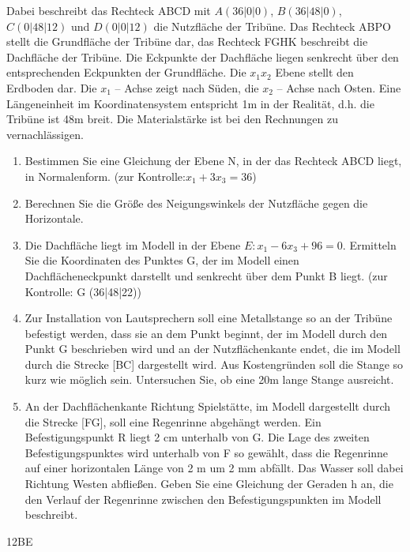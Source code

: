 \documentclass[a4paper,12pt]{article}
\begin{document}
Dabei beschreibt das Rechteck ABCD mit
  $A (36|0|0)$, $ B (36|48|0)$, $C (0|48|12)$ und $ D (0|0|12) $
die Nutzfläche der Tribüne. Das Rechteck ABPO stellt die Grundfläche der Tribüne dar, das
Rechteck FGHK beschreibt die Dachfläche der Tribüne. Die Eckpunkte der Dachfläche liegen
senkrecht über den entsprechenden Eckpunkten der Grundfläche.
Die $x_1x_2 $  Ebene stellt den Erdboden dar. Die $ x_1$ – Achse zeigt nach Süden, die $x_2$ – Achse nach
Osten. Eine Längeneinheit im Koordinatensystem entspricht 1m in der Realität, d.h. die Tribüne ist
48m breit. Die Materialstärke ist bei den Rechnungen zu vernachlässigen.
\begin{enumerate}[label={\alph*)}]
\item  Bestimmen Sie eine Gleichung der Ebene N, in der das Rechteck ABCD liegt, in
Normalenform. (zur Kontrolle:$ x_1 + 3x_3 = 36 $)
\item Berechnen Sie die Größe des Neigungswinkels der Nutzfläche gegen die Horizontale.
\item Die Dachfläche liegt im Modell in der Ebene $E: x_1 - 6x_3 + 96 = 0.$
Ermitteln Sie die Koordinaten des Punktes G, der im Modell einen Dachflächeneckpunkt
darstellt und senkrecht über dem Punkt B liegt. (zur Kontrolle: G (36|48|22))
\item Zur Installation von Lautsprechern soll eine Metallstange so an der Tribüne befestigt
werden, dass sie an dem Punkt beginnt, der im Modell durch den Punkt G beschrieben wird
und an der Nutzflächenkante endet, die im Modell durch die Strecke [BC] dargestellt wird.
Aus Kostengründen soll die Stange so kurz wie möglich sein. Untersuchen Sie, ob eine 20m
lange Stange ausreicht.
\item An der Dachflächenkante Richtung Spielstätte, im Modell dargestellt durch die Strecke
[FG], soll eine Regenrinne abgehängt werden. Ein Befestigungspunkt R liegt 2 cm
unterhalb von G. Die Lage des zweiten Befestigungspunktes wird unterhalb von F so
gewählt, dass die Regenrinne auf einer horizontalen Länge von 2 m um 2 mm abfällt. Das
Wasser soll dabei Richtung Westen abfließen. Geben Sie eine Gleichung der Geraden h an,
die den Verlauf der Regenrinne zwischen den Befestigungspunkten im Modell beschreibt.
\end{enumerate}


\begin{flushright}12BE \end{flushright}







\end{document}
